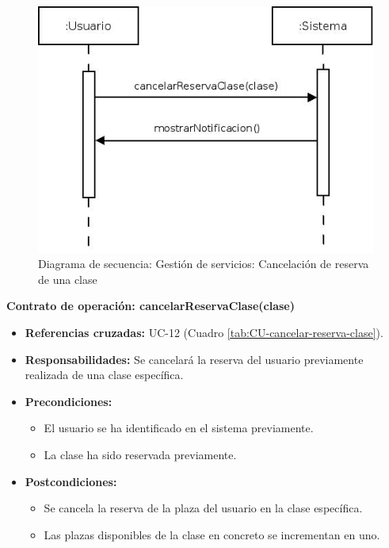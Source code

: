 \begin{figure}[H]
\centering
  \includegraphics[scale=.55]{img/secuencias/gestion-servicios-cancelar-reserva-clase.jpeg}
  \caption{Diagrama de secuencia: Gestión de servicios: Cancelación de reserva de una clase}
  \label{fig:secuencia-gestion-servicios-cancelar-reserva-clase}
\end{figure}

\textbf{Contrato de operación: cancelarReservaClase(clase)}
\begin{itemize}
\item \textbf{Referencias cruzadas:} UC-12 (Cuadro \ref{tab:CU-cancelar-reserva-clase}).
\item \textbf{Responsabilidades:} Se cancelará la reserva del usuario previamente realizada de una clase específica.
\item \textbf{Precondiciones:} 
 \begin{itemize}
\item El usuario se ha identificado en el sistema previamente.
\item La clase ha sido reservada previamente.
\end {itemize}
\item \textbf{Postcondiciones:} 
 \begin{itemize}
\item Se cancela la reserva de la plaza del usuario en la clase específica.
\item Las plazas disponibles de la clase en concreto se incrementan en uno.
\end {itemize}
\end {itemize}

